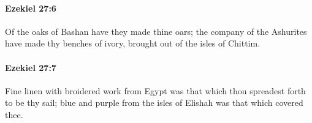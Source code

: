 		\paragraph{Ezekiel 27:6} %
			\label{EZEKIEL-27-6}

			Of the oaks of Bashan have they made thine oars; the company of the Ashurites have made thy benches of ivory, brought out of the isles of Chittim.


		\paragraph{Ezekiel 27:7} %
			\label{EZEKIEL-27-7}

			Fine linen with broidered work from Egypt was that which thou spreadest forth to be thy sail; blue and purple from the isles of Elishah was that which covered thee.


